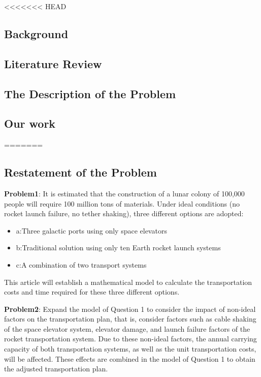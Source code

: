 

<<<<<<< HEAD
\subsection{Background} %
%


%
\subsection{Literature Review}




\subsection{The Description of the Problem} %





\subsection{Our work} %

=======
\subsection{Restatement of the Problem} %

\textbf{Problem1}:
It is estimated that the construction of a lunar colony of 100,000 people will require 100 million tons of materials. Under ideal conditions (no rocket launch failure, no tether shaking), three different options are adopted:
\begin{itemize}
  \item a:Three galactic ports using only space elevators
  \item b:Traditional solution using only ten Earth rocket launch systems
  \item c:A combination of two transport systems
\end{itemize}

This article will establish a mathematical model to calculate the transportation costs and time required for these three different options.

\textbf{Problem2}:
Expand the model of Question 1 to consider the impact of non-ideal factors on the transportation plan, that is, consider factors such as cable shaking of the space elevator system, elevator damage, and launch failure factors of the rocket transportation system. Due to these non-ideal factors, the annual carrying capacity of both transportation systems, as well as the unit transportation costs, will be affected. These effects are combined in the model of Question 1 to obtain the adjusted transportation plan.

